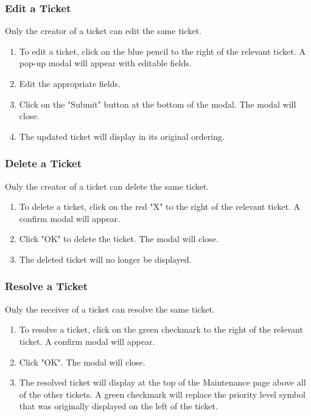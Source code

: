 \documentclass[12pt]{article}
\begin{document}
    \subsubsection{Edit a Ticket}
    Only the creator of a ticket can edit the same ticket.
    \begin{enumerate}
        \item To edit a ticket, click on the blue pencil to the right of the relevant ticket. A pop-up modal will appear with editable fields.
        \item Edit the appropriate fields.
        \item Click on the "Submit" button at the bottom of the modal. The modal will close.
        \item The updated ticket will display in its original ordering.
    \end{enumerate}

    \subsubsection{Delete a Ticket}
    Only the creator of a ticket can delete the same ticket.
    \begin{enumerate}
        \item To delete a ticket, click on the red "X" to the right of the relevant ticket. A confirm modal will appear.
        \item Click "OK" to delete the ticket. The modal will close.
        \item The deleted ticket will no longer be displayed.
    \end{enumerate}

    \subsubsection{Resolve a Ticket}
    Only the receiver of a ticket can resolve the same ticket.
    \begin{enumerate}
        \item To resolve a ticket, click on the green checkmark to the right of the relevant ticket. A confirm modal will appear.
        \item Click "OK". The modal will close.
        \item The resolved ticket will display at the top of the Maintenance page above all of the other tickets. A green checkmark will replace the priority level symbol that was originally displayed on the left of the ticket.
    \end{enumerate}
\end{document}
